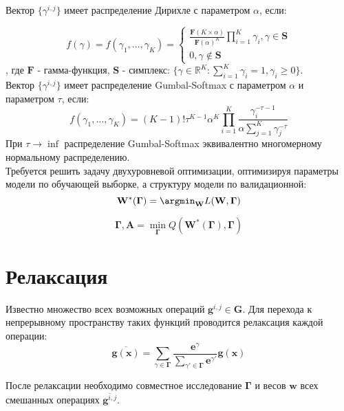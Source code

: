 \documentclass[12pt,twoside]{article}
\begin{document}
Вектор $\{{\gamma}^{i,j}\}$ имеет распределение Дирихле с параметром $\alpha$, если:

\[
f(\gamma) = f(\gamma_1, \dots,\gamma_K) = 
\begin{cases}
\frac{\boldsymbol{F} (K\times\alpha)}{{\boldsymbol{F}(\alpha)}^{K}}\prod\limits_{i = 1}^K\gamma_i,\gamma \in \boldsymbol{S}
\\
0, \gamma\notin \boldsymbol{S}
\end{cases}
\],
где $\boldsymbol{F}$ - гамма-функция, $\boldsymbol{S}$ - симплекс: $\{\gamma \in \mathbb{R}^K: \sum_{i=1}^K \gamma_i = 1, \gamma_i \geqslant 0\}$.
\\

Вектор $\{{\gamma}^{i,j}\}$ имеет распределение Gumbal-Softmax с параметром $\alpha$ и параметром $\tau$, если:
\[
f(\gamma_1, \dots,\gamma_K) = (K-1)!\tau^{K-1}\alpha^K\prod\limits_{i = 1}^K\frac{\gamma_i^{-\tau - 1}}{\alpha\sum_{j=1}^K\gamma_j^{-\tau}}
\]
При $\tau\to\inf$ распределение Gumbal-Softmax эквивалентно многомерному нормальному распределению.
\\

Требуется решить задачу двухуровневой оптимизации, оптимизируя параметры модели по обучающей выборке, а структуру модели по валидационной: 
\[
\mathbf{W}^*( \boldsymbol{\Gamma}) = \argmin_{\mathbf{W}}
L (\mathbf{W}, \boldsymbol{\Gamma})\]

\[
\boldsymbol{\Gamma}, \mathbf{A} = \min_{\boldsymbol{\Gamma}} Q (\mathbf{W}^*( \boldsymbol{\Gamma}), \boldsymbol{\Gamma})
\]

\section{Релаксация}
Известно множество всех возможных операций $\mathbf{g}^{i,j} \in \mathbf{G}$. Для перехода к непрерывному пространству таких функций проводится релаксация каждой операции:
\[
\overline{\mathbf{g}(\mathbf{x})} = \sum_{\gamma \in  \boldsymbol{\Gamma}} \frac{\boldsymbol{e}^{\gamma}}{\sum_{\gamma' \in  \boldsymbol{\Gamma}}\boldsymbol{e}^{\gamma'}}\mathbf{g}(\mathbf{x})
\]

После релаксации необходимо совместное исследование $\boldsymbol{\Gamma}$ и весов $\boldsymbol{w}$ всех смешанных операциях $\overline{\mathbf{g}^{i,j}}$.




\end{document}
